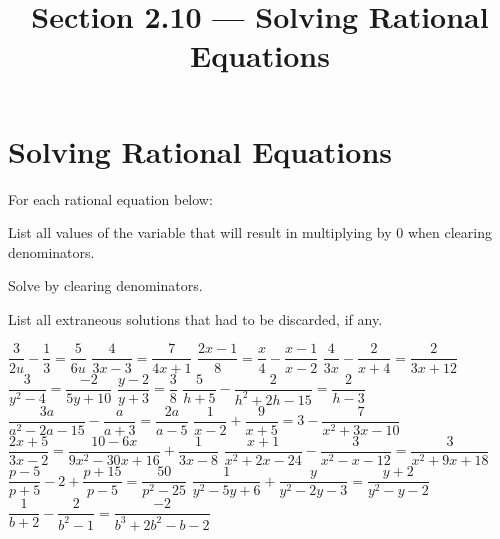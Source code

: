 

\title{Section 2.10 --- Solving Rational Equations}


\maketitle
\section{Solving Rational Equations}
For each rational equation below:
\begin{clist}
\item List all values of the variable that will result in multiplying by 0 when clearing denominators.
\item Solve by clearing denominators.
\item List all extraneous solutions that had to be discarded, if any.
\end{clist}
\begin{smenum}
\mitemxxx
{$\dfrac{3}{2u}-\dfrac{1}{3}=\dfrac{5}{6u}$}
{$\dfrac{4}{3x-3}=\dfrac{7}{4x+1}$}
{$\dfrac{2x-1}{8}=\dfrac{x}{4}-\dfrac{x-1}{x-2}$}
\mitemxxx
{$\dfrac{4}{3x}-\dfrac{2}{x+4}=\dfrac{2}{3x+12}$}
{$\dfrac{3}{y^2-4}=\dfrac{-2}{5y+10}$}
{$\dfrac{y-2}{y+3}=\dfrac{3}{8}$}
\mitemxx
{$\dfrac{5}{h+5}-\dfrac{2}{h^2+2h-15}=\dfrac{2}{h-3}$}
{$\dfrac{3a}{a^2-2a-15}-\dfrac{a}{a+3}=\dfrac{2a}{a-5}$}
\mitemxx
{$\dfrac{1}{x-2}+\dfrac{9}{x+5}=3-\dfrac{7}{x^2+3x-10}$}
{$\dfrac{2x+5}{3x-2}=\dfrac{10-6x}{9x^2-30x+16}+\dfrac{1}{3x-8}$}
\mitemxx
{$\dfrac{x+1}{x^2+2x-24}-\dfrac{3}{x^2-x-12}=\dfrac{3}{x^2+9x+18}$}
{$\dfrac{p-5}{p+5}-2+\dfrac{p+15}{p-5}=\dfrac{50}{p^2-25}$}
\mitemxx
{$\dfrac{1}{y^2-5y+6}+\dfrac{y}{y^2-2y-3}=\dfrac{y+2}{y^2-y-2}$}
{$\dfrac{1}{b+2}-\dfrac{2}{b^2-1}=\dfrac{-2}{b^3+2b^2-b-2}$}
\end{smenum}

